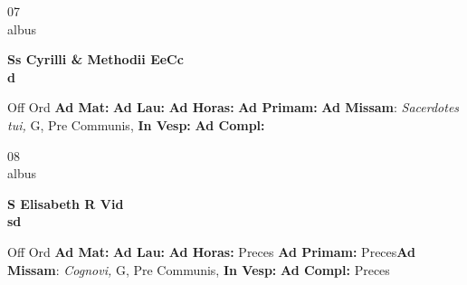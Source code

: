 \documentclass[10pt, openany]{book}
\begin{document}
    \begin{center}
        \begin{minipage}{3.5in}
            \vspace{2em}
            \begin{minipage}{0.5in}
                {\Huge 07} \\
                {\normalsize albus}
            \end{minipage}
            \begin{minipage}{3.0in}
                \textbf{ \large Ss Cyrilli \& Methodii EeCc \\
                \textnormal{\normalsize d}}

            \end{minipage}
            \begin{justify}Off Ord
                \textbf{Ad Mat: }
                \textbf{Ad Lau: }
                \textbf{Ad Horas: }
                \textbf{Ad Primam: }\textbf{Ad Missam}: \textit{Sacerdotes tui,} G, Pre Communis, 
                \textbf{In Vesp: }
                \textbf{Ad Compl: }
            \end{justify}
        \end{minipage}
    \end{center}

    \begin{center}
        \begin{minipage}{3.5in}
            \vspace{2em}
            \begin{minipage}{0.5in}
                {\Huge 08} \\
                {\normalsize albus}
            \end{minipage}
            \begin{minipage}{3.0in}
                \textbf{ \large S Elisabeth R Vid \\
                \textnormal{\normalsize sd}}

            \end{minipage}
            \begin{justify}Off Ord
                \textbf{Ad Mat: }
                \textbf{Ad Lau: }
                \textbf{Ad Horas: }Preces
                \textbf{Ad Primam: }Preces\textbf{Ad Missam}: \textit{Cognovi,} G, Pre Communis, 
                \textbf{In Vesp: }
                \textbf{Ad Compl: }Preces
            \end{justify}
        \end{minipage}
    \end{center}
\end{document}
